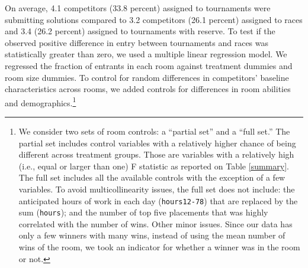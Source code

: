 \documentclass[10pt, titlepage]{article}
\begin{document}
On average, 4.1 competitors (33.8 percent) assigned to tournaments were
submitting solutions compared to 3.2 competitors (26.1 percent) assigned
to races and 3.4 (26.2 percent) assigned to tournaments with reserve. To
test if the observed positive difference in entry between tournaments
and races was statistically greater than zero, we used a multiple linear
regression model. We regressed the fraction of entrants in each room
against treatment dummies and room size dummies. To control for random
differences in competitors' baseline characteristics across rooms, we
added controls for differences in room abilities and
demographics.\footnote{We consider two sets of room controls: a
  ``partial set'' and a ``full set.'' The partial set includes control
  variables with a relatively higher chance of being different across
  treatment groups. Those are variables with a relatively high (i.e.,
  equal or larger than one) F statistic as reported on Table
  \ref{summary}. The full set includes all the available controls with
  the exception of a few variables. To avoid multicollinearity issues,
  the full set does not include: the anticipated hours of work in each
  day (\texttt{hours12-78}) that are replaced by the sum
  (\texttt{hours}); and the number of top five placements that was
  highly correlated with the number of wins. Other minor issues. Since
  our data has only a few winners with many wins, instead of using the
  mean number of wins of the room, we took an indicator for whether a
  winner was in the room or not.}
\end{document}
